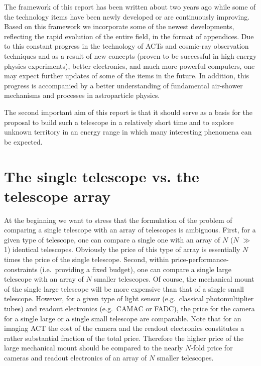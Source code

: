The framework of this report has been written about two 
years ago while some of the technology items 
have been newly developed or
are continuously improving.
Based on this framework we incorporate some of the newest developments,
reflecting the rapid evolution of the entire field, in the format
of appendices. 
Due to this constant progress in 
the technology of ACTs and cosmic-ray observation techniques and
as a result of new concepts (proven to be  successful in high
energy physics experiments), better electronics, and much more powerful computers,
one may expect further updates of some of the items in the future.
In addition, this progress
is accompanied by a better understanding
of fundamental air-shower mechanisms and processes in
astroparticle physics.

The second important aim of this report is that it should serve as a basis
for the proposal to build such a telescope in a relatively short time and to
explore unknown territory in an energy range in which many interesting
phenomena can be expected.


\section{The single telescope vs. the telescope array}

\par \medskip At the beginning we want to stress that the formulation
of the problem of comparing
a single telescope with an array of telescopes is ambiguous.
First, for a given type of telescope, 
one can compare a single one 
with an array of $N$ ($N$ $\gg$ 1) identical telescopes.
Obviously the price of this type of array is essentially
$N$ times the price of the single telescope. 
Second, within price-performance-constraints (i.e.\ providing
a fixed budget),
one can compare a single large telescope with an array
of $N$ smaller telescopes. 
Of course, the mechanical mount of the single large telescope
will be more expensive than that of a single
small telescope.
However, for a given type of light sensor 
(e.g.\ classical photomultiplier tubes)
and readout electronics (e.g.\ CAMAC or FADC), the price for the camera
for a single large or a single small telescope are comparable. 
Note that for an imaging ACT the cost of
the camera and the readout electronics constitutes a rather substantial
fraction of the total price.
Therefore the higher price of the large mechanical mount
should be compared to 
the nearly $N$-fold price for cameras and readout electronics 
of an array of $N$ smaller telescopes.

